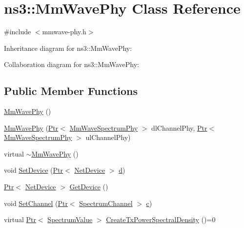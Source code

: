 \hypertarget{classns3_1_1MmWavePhy}{}\section{ns3\+:\+:Mm\+Wave\+Phy Class Reference}
\label{classns3_1_1MmWavePhy}


{\ttfamily \#include $<$mmwave-\/phy.\+h$>$}



Inheritance diagram for ns3\+:\+:Mm\+Wave\+Phy\+:


Collaboration diagram for ns3\+:\+:Mm\+Wave\+Phy\+:
\subsection*{Public Member Functions}
\begin{DoxyCompactItemize}
\item 
\hyperlink{classns3_1_1MmWavePhy_a09ab3a0e8114e43dd531977bca8c5f97}{Mm\+Wave\+Phy} ()
\item 
\hyperlink{classns3_1_1MmWavePhy_a32b6a5683c176854b55292b91c864e8e}{Mm\+Wave\+Phy} (\hyperlink{classns3_1_1Ptr}{Ptr}$<$ \hyperlink{classns3_1_1MmWaveSpectrumPhy}{Mm\+Wave\+Spectrum\+Phy} $>$ dl\+Channel\+Phy, \hyperlink{classns3_1_1Ptr}{Ptr}$<$ \hyperlink{classns3_1_1MmWaveSpectrumPhy}{Mm\+Wave\+Spectrum\+Phy} $>$ ul\+Channel\+Phy)
\item 
virtual \hyperlink{classns3_1_1MmWavePhy_af426a259ae512ef03885bbfc40154471}{$\sim$\+Mm\+Wave\+Phy} ()
\item 
void \hyperlink{classns3_1_1MmWavePhy_abf1d8416cb6a047e1328c9e27a04eb08}{Set\+Device} (\hyperlink{classns3_1_1Ptr}{Ptr}$<$ \hyperlink{classns3_1_1NetDevice}{Net\+Device} $>$ \hyperlink{lte__pathloss_8m_a1aabac6d068eef6a7bad3fdf50a05cc8}{d})
\item 
\hyperlink{classns3_1_1Ptr}{Ptr}$<$ \hyperlink{classns3_1_1NetDevice}{Net\+Device} $>$ \hyperlink{classns3_1_1MmWavePhy_a98345800df0196771011c8c2aab5ba29}{Get\+Device} ()
\item 
void \hyperlink{classns3_1_1MmWavePhy_a0703ef5f6b3f4dec6b8c3623f558c1d7}{Set\+Channel} (\hyperlink{classns3_1_1Ptr}{Ptr}$<$ \hyperlink{classns3_1_1SpectrumChannel}{Spectrum\+Channel} $>$ \hyperlink{mmwave_2model_2fading-traces_2fading__trace__generator_8m_ae0323a9039add2978bf5b49550572c7c}{c})
\item 
virtual \hyperlink{classns3_1_1Ptr}{Ptr}$<$ \hyperlink{classns3_1_1SpectrumValue}{Spectrum\+Value} $>$ \hyperlink{classns3_1_1MmWavePhy_a0d0cd6f84e8ba27851c2a40a50d82d31}{Create\+Tx\+Power\+Spectral\+Density} ()=0

\end{DoxyCompactItemize}

